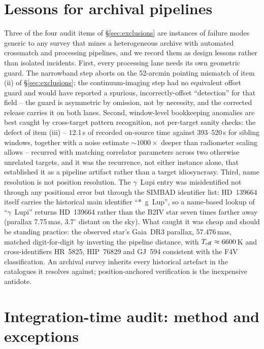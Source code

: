 \documentclass{openjournal}
\begin{document}
\section{Lessons for archival pipelines}
\label{app:lessons}

Three of the four audit items of \S\ref{sec:exclusions} are instances
of failure modes generic to any survey that mines a heterogeneous
archive with automated crossmatch and processing pipelines, and we
record them as design lessons rather than isolated incidents. First,
every processing lane needs its own geometric guard. The narrowband
step aborts on the 52-arcmin pointing mismatch of item (ii) of
\S\ref{sec:exclusions}; the continuum-imaging step had no equivalent
offset guard and would have reported a spurious, incorrectly-offset
``detection'' for that field -- the guard is asymmetric by omission,
not by necessity, and the corrected release carries it on both lanes.
Second, window-level bookkeeping anomalies are best caught by
cross-target pattern recognition, not per-target sanity checks: the
defect of item (iii) -- 12.1\,s of recorded on-source time against
393--520\,s for sibling windows, together with a noise estimate
${\sim}1000\times$ deeper than radiometer scaling allows -- recurred
with matching correlator parameters across two otherwise unrelated
targets, and it was the recurrence, not either instance alone, that
established it as a pipeline artifact rather than a target
idiosyncrasy. Third, name resolution is not position resolution. The
$\gamma$~Lupi entry was misidentified not through any positional error
but through the SIMBAD identifier list: HD~139664 itself carries the
historical main identifier ``*~g~Lup'', so a name-based lookup of
``$\gamma$~Lupi'' returns HD~139664 rather than the B2IV star seven
times farther away (parallax 7.75\,mas, $3.7^{\circ}$ distant on the
sky). What caught it was cheap and should be standing practice: the
observed star's Gaia~DR3 parallax, 57.476\,mas, matched
digit-for-digit by inverting the pipeline distance, with
$T_{\rm eff}\approx6600$\,K and cross-identifiers HR~5825, HIP~76829
and GJ~594 consistent with the F4V classification. An archival survey
inherits every historical artefact in the catalogues it resolves
against; position-anchored verification is the inexpensive antidote.

\section{Integration-time audit: method and exceptions}
\label{app:audit}
\end{document}
